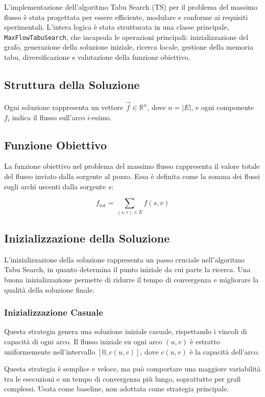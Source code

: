 \documentclass[12pt,a4paper]{article}
\begin{document}
L'implementazione dell'algoritmo Tabu Search (TS) per il problema del massimo flusso è stata progettata per essere efficiente, modulare e conforme ai requisiti sperimentali. L'intera logica è stata strutturata in una classe principale, \texttt{MaxFlowTabuSearch}, che incapsula le operazioni principali: inizializzazione del grafo, generazione della soluzione iniziale, ricerca locale, gestione della memoria tabu, diversificazione e valutazione della funzione obiettivo.

\subsection{Struttura della Soluzione}
Ogni soluzione rappresenta un vettore $ \vec{f} \in \mathbb{R}^n $, dove $ n = |E| $, e ogni componente $ f_i $ indica il flusso sull’arco $ i $-esimo.

\subsection{Funzione Obiettivo}
La funzione obiettivo nel problema del massimo flusso rappresenta il valore totale del flusso inviato dalla sorgente al pozzo. Essa è definita come la somma dei flussi sugli archi uscenti dalla sorgente $ s $:

$$
f_{\text{tot}} = \sum_{(s, v) \in E} f(s, v)
$$

\subsection{Inizializzazione della Soluzione}
L'inizializzazione della soluzione rappresenta un passo cruciale nell'algoritmo Tabu Search, in quanto determina il punto iniziale da cui parte la ricerca. Una buona inizializzazione permette di ridurre il tempo di convergenza e migliorare la qualità della soluzione finale.

\subsubsection{Inizializzazione Casuale}
Questa strategia genera una soluzione iniziale casuale, rispettando i vincoli di capacità di ogni arco. Il flusso iniziale su ogni arco $ (u,v) $ è estratto uniformemente nell’intervallo $ [0, c(u,v)] $, dove $ c(u,v) $ è la capacità dell’arco.

Questa strategia è semplice e veloce, ma può comportare una maggiore variabilità tra le esecuzioni e un tempo di convergenza più lungo, soprattutto per grafi complessi.  Usata come baseline, non adottata come strategia principale.
\end{document}

